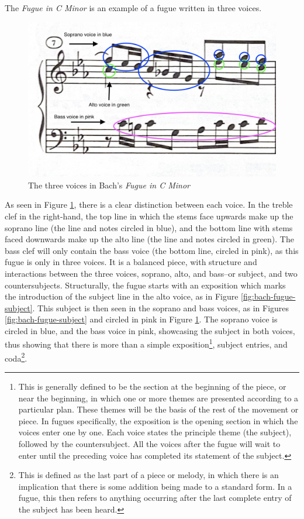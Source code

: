The \textit{Fugue in C Minor} is an example of a fugue written in three voices.
\begin{figure}
    \centering
    \includegraphics[width=.5\textwidth]{figures/fugue-three-voices.jpg}
    \caption{The three voices in Bach's \textit{Fugue in C Minor}}
    \label{fig:bach-fugue-three-voices}
\end{figure}
As seen in Figure \ref{fig:bach-fugue-three-voices}\autocite{Henle_2009}, there is a clear distinction between each voice. In the treble clef in the right-hand, the top line in which the stems face upwards make up the soprano line (the line and notes circled in blue), and the bottom line with stems faced downwards make up the alto line (the line and notes circled in green). The bass clef will only contain the bass voice (the bottom line, circled in pink), as this fugue is only in three voices. It is a balanced piece, with structure and interactions between the three voices, soprano, alto, and bass--or subject, and two countersubjects. Structurally, the fugue starts with an exposition which marks the introduction of the subject line in the alto voice, as in Figure \ref{fig:bach-fugue-subject}\autocite{Henle_2009}. This subject is then seen in the soprano and bass voices, as in Figures \ref{fig:bach-fugue-subject}\autocite{Henle_2009} and circled in pink in Figure \ref{fig:bach-fugue-three-voices}\autocite{Henle_2009}. The soprano voice is circled in blue, and the bass voice in pink, showcasing the subject in both voices, thus showing that there is more than a simple exposition\footnote{This is generally defined to be the section at the beginning of the piece, or near the beginning, in which one or more themes are presented according to a particular plan. These themes will be the basis of the rest of the movement or piece. In fugues specifically, the exposition is the opening section in which the voices enter one by one. Each voice states the principle theme (the subject), followed by the countersubject. All the voices after the fugue will wait to enter until the preceding voice has completed its statement of the subject.}\autocite{Walker_2001b}, subject entries, and coda\footnote{This is defined as the last part of a piece or melody, in which there is an implication that there is some addition being made to a standard form. In a fugue, this then refers to anything occurring after the last complete entry of the subject has been heard.}\autocite{Bullivant_2001}. 

